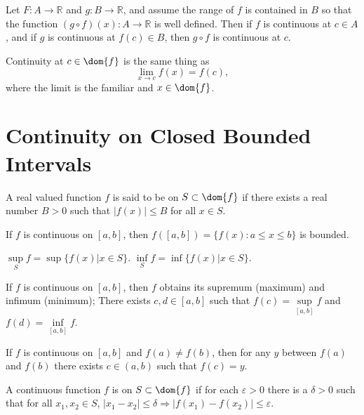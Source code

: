 \newpage

\begin{theorem}
Let $F: A \rightarrow \mathbb{R}$ and $g: B \rightarrow \mathbb{R}$, and assume the range of $f$ is contained in $B$ so that the function $(g\circ f)(x): A \rightarrow \mathbb{R}$ is well defined. Then if $f$ is continuous at $c \in A$, and if $g$ is continuous at $f(c) \in B$, then $g\circ f$ is continuous at $c$. 
\end{theorem}
Continuity at $c \in \dom{f}$ is the same thing as $$ \lim_{x\to c} f(x) = f(c),$$ where the limit is the familiar  and $x \in \dom{f}$. 
\section{Continuity on Closed Bounded Intervals}
\begin{definition}
A real valued function $f$ is said to be  on $S \subset \dom{f}$ if there exists a real number $B > 0$ such that $|f(x)| \leq B$ for all $x \in S$. 
\end{definition}

\begin{theorem}
If $f$ is continuous on $[a,b]$, then $f([a,b]) = \{f(x) : a\leq x\leq b\}$ is bounded. 
\end{theorem}

\begin{definition}
$\sup\limits_S f = \sup{\{f(x) | x \in S\}}$. $\inf\limits_S f = \inf{\{f(x)|x\in S\}}$. 
\end{definition}

\begin{theorem}
If $f$ is continuous on $[a,b]$, then $f$ obtains its supremum (maximum) and infimum (minimum); There exists $c,d \in [a,b]$ such that $f(c) = \sup\limits_{[a,b]} f$ and $f(d) = \inf\limits_{[a,b]} f$. 
\end{theorem}

\begin{theorem}
If $f$ is continuous on $[a,b]$ and $f(a) \neq f(b)$, then for any $y$ between $f(a)$ and $f(b)$ there exists $c \in (a,b)$ such that $f(c) = y$. 
\end{theorem}
\begin{definition}
A continuous function $f$ is  on $S \subset \dom{f}$ if for each $\varepsilon >0$ there is a $\delta > 0$ such that for all $x_1, x_2 \in S$, $|x_1-x_2| \leq \delta \Rightarrow |f(x_1) - f(x_2)| \leq \varepsilon$. 
\end{definition}

